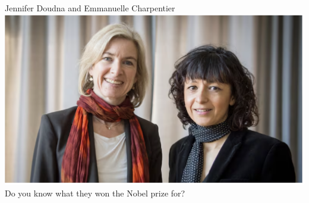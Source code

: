 \documentclass[xcolor=dvipsnames]{beamer}
\begin{document}
\begin{frame}
	
			\centering	
			Jennifer Doudna and Emmanuelle Charpentier
			\includegraphics[keepaspectratio, width  = \textwidth]{img/nobelCRISPR_1}\\
			\Large Do you know what they won the Nobel prize for?
\end{frame}
\end{document}
